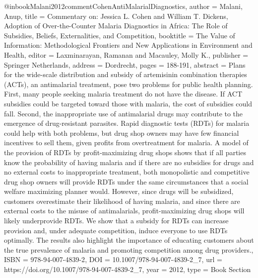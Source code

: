 @inbook{Malani2012commentCohenAntiMalarialDiagnostics,
   author = {Malani, Anup},
   title = {Commentary on: Jessica L. Cohen and William T. Dickens, Adoption of Over-the-Counter Malaria Diagnostics in Africa: The Role of Subsidies, Beliefs, Externalities, and Competition},
   booktitle = {The Value of Information: Methodological Frontiers and New Applications in Environment and Health},
   editor = {Laxminarayan, Ramanan and Macauley, Molly K.},
   publisher = {Springer Netherlands},
   address = {Dordrecht},
   pages = {188-191},
   abstract = {Plans for the wide-scale distribution and subsidy of artemisinin combination therapies (ACTs), an antimalarial treatment, pose two problems for public health planning. First, many people seeking malaria treatment do not have the disease. If ACT subsidies could be targeted toward those with malaria, the cost of subsidies could fall. Second, the inappropriate use of antimalarial drugs may contribute to the emergence of drug-resistant parasites. Rapid diagnostic tests (RDTs) for malaria could help with both problems, but drug shop owners may have few financial incentives to sell them, given profits from overtreatment for malaria. A model of the provision of RDTs by profit-maximizing drug shops shows that if all parties know the probability of having malaria and if there are no subsidies for drugs and no external costs to inappropriate treatment, both monopolistic and competitive drug shop owners will provide RDTs under the same circumstances that a social welfare maximizing planner would. However, since drugs will be subsidized, customers overestimate their likelihood of having malaria, and since there are external costs to the misuse of antimalarials, profit-maximizing drug shops will likely underprovide RDTs. We show that a subsidy for RDTs can increase provision and, under adequate competition, induce everyone to use RDTs optimally. The results also highlight the importance of educating customers about the true prevalence of malaria and promoting competition among drug providers.},
   ISBN = {978-94-007-4839-2},
   DOI = {10.1007/978-94-007-4839-2_7},
   url = {https://doi.org/10.1007/978-94-007-4839-2_7},
   year = {2012},
   type = {Book Section}
}




